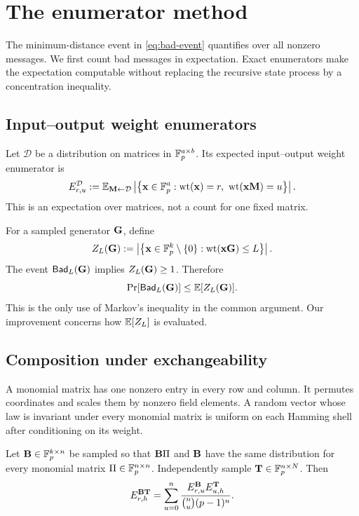 \section{The enumerator method}
\label{sec:enumerator-method}

The minimum-distance event in \eqref{eq:bad-event} quantifies over all
nonzero messages.  We first count bad messages in expectation.  Exact
enumerators make the expectation computable without replacing the recursive
state process by a concentration inequality.

\subsection{Input--output weight enumerators}

Let $\mathcal D$ be a distribution on matrices in $\mathbb F_p^{a\times b}$.  Its
expected input--output weight enumerator is
\begin{equation}
 E^{\mathcal D}_{r,u}:=
 \mathbb E_{\mathbf M\gets\mathcal D}
 \left|\left\{\mathbf x\in\mathbb F_p^a:
   \operatorname{wt}(\mathbf x)=r,\ \operatorname{wt}(\mathbf x\mathbf M)=u
 \right\}\right|.
 \label{eq:io-enumerator}
\end{equation}
This is an expectation over matrices, not a count for one fixed matrix.

For a sampled generator $\mathbf G$, define
\begin{equation}
 Z_L(\mathbf G):=
 \left|\left\{\mathbf x\in\mathbb F_p^k\setminus\{0\}:
 \operatorname{wt}(\mathbf x\mathbf G)\leq L\right\}\right|.
 \label{eq:bad-message-count}
\end{equation}
The event $\mathsf{Bad}_L(\mathbf G)$ implies $Z_L(\mathbf G)\geq1$.  Therefore
\begin{equation}
 \Pr[\mathsf{Bad}_L(\mathbf G)]\leq \mathbb E[Z_L(\mathbf G)].
 \label{eq:first-moment}
\end{equation}
This is the only use of Markov's inequality in the common argument.  Our
improvement concerns how $\mathbb E[Z_L]$ is evaluated.

\subsection{Composition under exchangeability}

A monomial matrix has one nonzero entry in every row and column.  It permutes
coordinates and scales them by nonzero field elements.  A random vector whose
law is invariant under every monomial matrix is uniform on each Hamming shell
after conditioning on its weight.

\begin{lemma}
\label{lem:exchangeable-composition}
Let $\mathbf B\in\mathbb F_p^{k\times n}$ be sampled so that $\mathbf B\Pi$ and $\mathbf B$ have the same
distribution for every monomial matrix $\Pi\in\mathbb F_p^{n\times n}$.
Independently sample $\mathbf T\in\mathbb F_p^{n\times N}$.  Then
\begin{equation}
 E^{\mathbf B\mathbf T}_{r,h}=
 \sum_{u=0}^{n}
 \frac{E^{\mathbf B}_{r,u}E^{\mathbf T}_{u,h}}
      {\binom{n}{u}(p-1)^u}.
 \label{eq:exchangeable-composition}
\end{equation}
\end{lemma}

